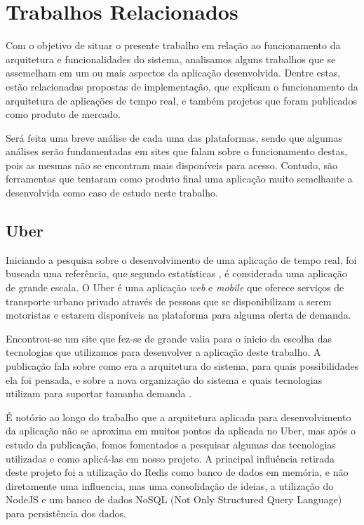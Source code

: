 \chapter{Trabalhos Relacionados}
Com o objetivo de situar o presente trabalho em relação ao funcionamento da arquitetura e funcionalidades do sistema, analisamos alguns trabalhos que se assemelham em um ou mais aspectos da aplicação desenvolvida. Dentre estas, estão relacionadas propostas de implementação, que explicam o funcionamento da arquitetura de aplicações de tempo real, e também projetos que foram publicados como produto de mercado.

Será feita uma breve análise de cada uma das plataformas, sendo que algumas análises serão fundamentadas em sites que falam sobre o funcionamento destas, pois as mesmas não se encontram mais disponíveis para acesso. Contudo, são ferramentas que tentaram como produto final uma aplicação muito semelhante a desenvolvida como caso de estudo neste trabalho.

\section{Uber}
Iniciando a pesquisa sobre o desenvolvimento de uma aplicação de tempo real, foi buscada uma referência, que segundo estatísticas \cite{uber-statistics}, é considerada uma aplicação de grande escala. O Uber \cite{uber} é uma aplicação \textit{web} e \textit{mobile} que oferece serviços de transporte urbano privado através de pessoas que se disponibilizam a serem motoristas e estarem disponíveis na plataforma para alguma oferta de demanda.

Encontrou-se um site \cite{uber-how-scales} que fez-se de grande valia para o inicio da escolha das tecnologias que utilizamos para desenvolver a aplicação deste trabalho. A publicação fala sobre como era a arquitetura do sistema, para quais possibilidades ela foi pensada, e sobre a nova organização do sistema e quais tecnologias utilizam para suportar tamanha demanda \cite{uber-statistics}.

É notório ao longo do trabalho que a arquitetura aplicada para desenvolvimento da aplicação não se aproxima em muitos pontos da aplicada no Uber, mas após o estudo da publicação, fomos fomentados a pesquisar algumas das tecnologias utilizadas e como aplicá-las em nosso projeto. A principal influência retirada deste projeto foi a utilização do Redis como banco de dados em memória, e não diretamente uma influencia, mas uma consolidação de ideias, a utilização do NodeJS e um banco de dados NoSQL (Not Only Structured Query Language) para persistência dos dados.

